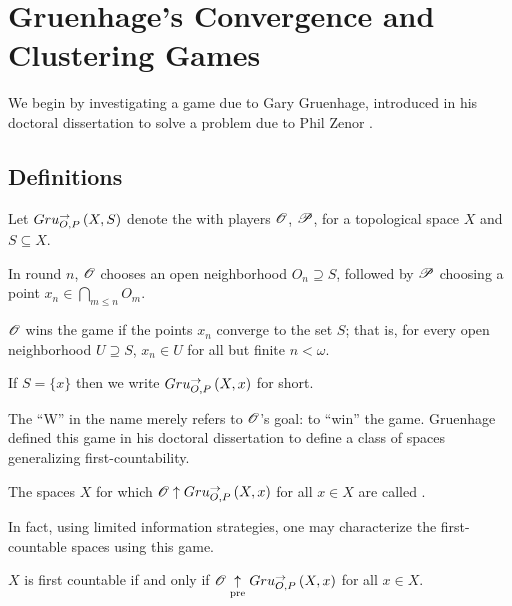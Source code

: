 
\chapter{Gruenhage's Convergence and Clustering Games}

We begin by investigating a game due to Gary Gruenhage, introduced in
his doctoral dissertation to solve a problem due to Phil Zenor
\cite{MR0394561}.

\section{Definitions}

\begin{game}
  Let $Gru_{O,P}^{\to}\left({X},{S}\right)$ denote the  with
  players $\mathscr{O}$, $\mathscr{P}$, for a topological space $X$ and $S\subseteq X$.

  In round $n$, $\mathscr{O}$ chooses an open neighborhood $O_n\supseteq S$, followed
  by $\mathscr{P}$ choosing a point $x_n\in \bigcap_{m\leq n}O_m$.

  $\mathscr{O}$ wins the game if the points $x_n$ converge to the set $S$; that is,
  for every open neighborhood $U\supseteq S$, $x_n\in U$ for
  all but finite $n<\omega$.

  If $S=\{x\}$ then we write $Gru_{O,P}^{\to}\left({X},{x}\right)$ for short.
\end{game}

The ``W'' in the name merely refers to $\mathscr{O}$'s goal: to ``win'' the game.
Gruenhage defined this game in his doctoral dissertation to define a class
of spaces generalizing first-countability. \cite{MR0413049}

\begin{defn}
  The spaces $X$ for which $\mathscr{O} \uparrow Gru_{O,P}^{\to}\left({X},{x}\right)$ for all $x\in X$ are
  called .
\end{defn}

In fact, using limited information strategies, one may characterize the
first-countable spaces using this game.

\begin{prop}
  $X$ is first countable
    if and only if
  $\mathscr{O} \underset{\text{pre}}{\uparrow} Gru_{O,P}^{\to}\left({X},{x}\right)$ for all $x\in X$.
\end{prop}

